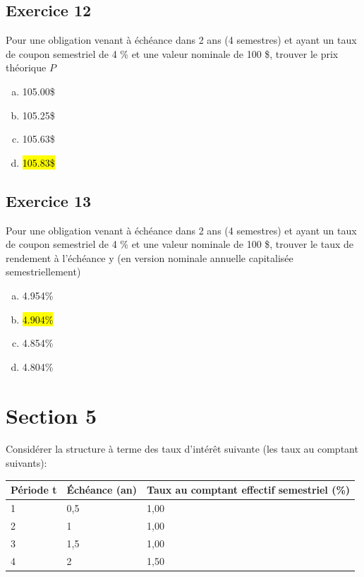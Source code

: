 \documentclass[10pt,a4paper]{article}
\begin{document}
\subsection*{Exercice 12}
Pour une obligation venant à échéance dans 2 ans (4 semestres) et ayant un taux de coupon semestriel de 4 \% et une valeur nominale de 100 \$,  trouver le prix théorique $P$

\begin{enumerate}[a)]
\item 105.00\$
\item 105.25\$
\item 105.63\$
\item  \hl{105.83\$}
\end{enumerate}


\subsection*{Exercice 13}
Pour une obligation venant à échéance dans 2 ans (4 semestres) et ayant un taux de coupon semestriel de 4 \% et une valeur nominale de 100 \$,  trouver le taux de rendement à l'échéance y (en version nominale annuelle capitalisée semestriellement)

\begin{enumerate}[a)]
\item 4.954\%
\item  \hl{4.904\%}
\item 4.854\%
\item 4.804\%
\end{enumerate}

\newpage

\section*{Section 5}
Considérer la structure à terme des taux d'intérêt suivante (les taux au comptant suivants): 

\begin{table}[H]
\begin{center}
\begin{tabular}{|l|l|l|}
\hline
Période t & Échéance (an) & Taux au comptant effectif semestriel (\%) \\ \hline
1         & 0,5           & 1,00                                      \\ \hline
2         & 1             & 1,00                                      \\ \hline
3         & 1,5           & 1,00                                      \\ \hline
4         & 2             & 1,50                                      \\ \hline
\end{tabular}
\end{center}
\end{table}
\end{document}
